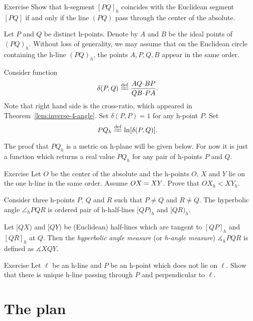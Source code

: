 \begin{thm}{Exercise}\label{ex:line/h-line}
Show that h-segment $[PQ]_h$ coincides with the Euclidean segment $[PQ]$
if and only if the line $(PQ)$ pass through  the center of the absolute.
\end{thm}





\label{h-dist}
Let $P$ and $Q$ be distinct h-points.
Denote by $A$ and $B$ be the ideal points of $(PQ)_h$.
Without loss of generality, we may assume that on the Euclidean circle containing the h-line $(PQ)_h$, the points $A,P,Q,B$ appear in the same order.

Consider function 
$$\delta(P,Q)\df\frac{AQ\cdot BP}{QB\cdot PA}.$$
Note that right hand side is the cross-ratio, 
which appeared in Theorem~\ref{lem:inverse-4-angle}.
Set $\delta(P,P)=1$ for any h-point $P$.
Set 
$$PQ_h\df\ln[\delta(P,Q)].$$

The proof that $PQ_h$ is a metric on h-plane will be given below.
For now it is just a function which returns a real value $PQ_h$ for any pair of h-points $P$ and $Q$.

\begin{thm}{Exercise}\label{ex:h-dist-eq}
Let $O$ be the center of the absolute and the h-points $O$, $X$ and $Y$ lie on the one h-line in the same order.
Assume $OX\z=XY$.
Prove that $OX_h<XY_h$.
\end{thm}


\label{h-angle measure}
Consider three h-points $P$, $Q$ and $R$
such that $P\ne Q$ and $R\ne Q$.
The hyperbolic angle $\angle_h PQR$ is ordered pair of h-half-lines $[QP)_h$ and $[QR)_h$.

Let $[QX)$ and $[QY)$ be (Euclidean) half-lines 
which are tangent to $[QP]_h$ and $[QR]_h$ 
at $Q$.
Then the \emph{hyperbolic angle measure} (or \emph{h-angle measure}) 
$\measuredangle_h PQR$ is defined as
$\measuredangle XQY$.

\begin{thm}{Exercise}\label{ex:h-perp-unique}
Let $\ell$ be an h-line and $P$ be an h-point which does not lie on $\ell$.
Show that there is unique h-line passing through $P$ and perpendicular to $\ell$.
\end{thm}

\section*{The plan}

